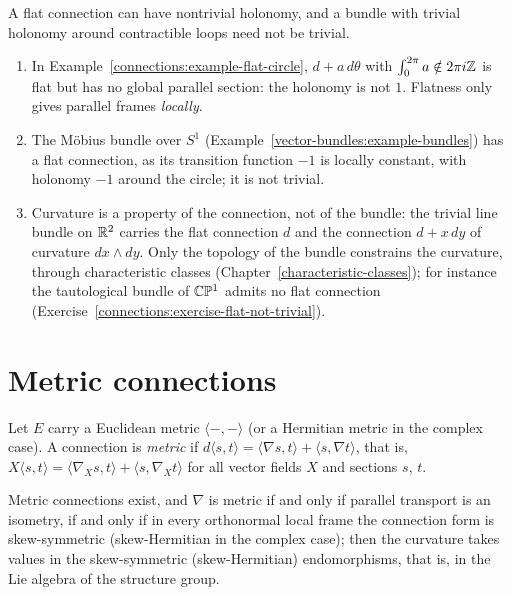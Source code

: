 \begin{counterexample}\label{connections:counterexample-flat-holonomy}
A flat connection can have nontrivial holonomy, and a bundle with trivial holonomy around contractible loops need not be trivial.
\begin{enumerate}
\item In Example~\ref{connections:example-flat-circle}, $d + a\,d\theta$ with $\int_0^{2\pi}a \notin 2\pi i\mathbb{Z}$ is flat but has no global parallel section: the holonomy is not $1$. Flatness
only gives parallel frames \emph{locally}.
\item The M\"obius bundle over $S^1$ (Example~\ref{vector-bundles:example-bundles}) has a flat connection, as its transition function $-1$ is locally constant, with holonomy $-1$
around the circle; it is not trivial.
\item Curvature is a property of the connection, not of the bundle: the trivial line bundle on $\mathbb{R}^2$ carries the flat connection $d$ and the connection $d + x\,dy$ of
curvature $dx \wedge dy$. Only the topology of the bundle constrains the curvature, through characteristic classes (Chapter~\ref{characteristic-classes}); for instance the
tautological bundle of $\mathbb{C}\mathbb{P}^1$ admits no flat connection (Exercise~\ref{connections:exercise-flat-not-trivial}).
\end{enumerate}
\end{counterexample}

\section{Metric connections}\label{connections:section-metric}

\begin{definition}\label{connections:definition-metric-connection}
Let $E$ carry a Euclidean metric $\langle -, - \rangle$ (or a Hermitian metric in the complex case). A connection is \emph{metric} if
$d\langle s, t \rangle = \langle \nabla s, t \rangle + \langle s, \nabla t \rangle$, that is, $X\langle s, t\rangle = \langle\nabla_Xs, t\rangle + \langle s, \nabla_Xt\rangle$ for all
vector fields $X$ and sections $s$, $t$.
\end{definition}

\begin{proposition}\label{connections:proposition-metric-connections}
Metric connections exist, and $\nabla$ is metric if and only if parallel transport is an isometry, if and only if in every orthonormal local frame the connection form is skew-symmetric (skew-Hermitian in
the complex case); then the curvature takes values in the skew-symmetric (skew-Hermitian) endomorphisms, that is, in the Lie algebra of the structure group.
\end{proposition}

